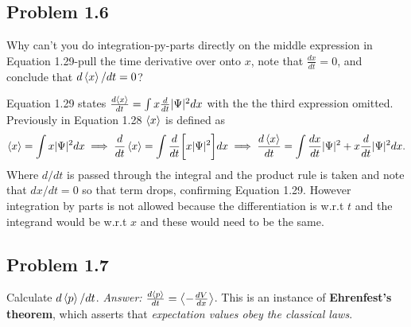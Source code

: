 \documentclass[12pt]{exam}
\begin{document}
\subsection*{Problem 1.6}
Why can't you do integration-py-parts directly on the middle expression in Equation 1.29-pull the time derivative over onto $x$, note that $\frac{dx}{dt}=0$, and conclude that $d\expval{x}/dt=0$?

\begin{solution}
    Equation 1.29 states $\frac{d\expval{x}}{dt} = \int x\frac{d}{dt}|\Psi|^2dx$ with the the third expression omitted. Previously in Equation 1.28 $\expval{x}$ is defined as 
    $$ \expval{x}  = \int x|\Psi|^2dx \implies \frac{d}{dt}\expval{x} = \int \frac{d}{dt}\bigg[x|\Psi|^2\bigg]dx \implies \frac{d\expval{x}}{dt} = \int \frac{dx}{dt}|\Psi|^2 + x\frac{d}{dt}|\Psi|^2dx.$$
    Where $d/dt$ is passed through the integral and the product rule is taken and note that $dx/dt = 0$ so that term drops, confirming Equation 1.29. However integration by parts is not allowed because the differentiation is w.r.t $t$ and the integrand would be w.r.t $x$ and these would need to be the same.
\end{solution}




\subsection*{Problem 1.7}
Calculate $d\expval{p}/dt$. \textit{Answer:} $\frac{d\expval{p}}{dt} = \expval{-\frac{dV}{dx}}$. This is an instance of \textbf{Ehrenfest's theorem}, which asserts that \textit{expectation values obey the classical laws}. 
\end{document}
